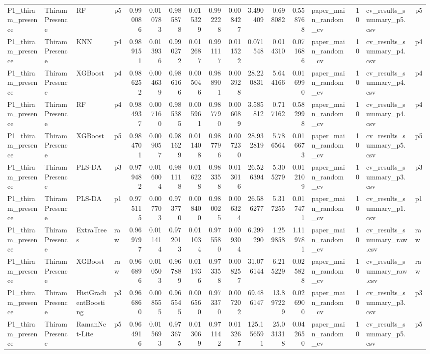 \begin{tabular}{llllrrrrrrrrrlrll}
P1_thiram_presence & Thiram Presence & RF & p5 & 0.990086 & 0.010783 & 0.985878 & 0.015329 & 0.992228 & 0.008427 & 3.490409 & 0.698082 & 0.558768 & paper_main_random_cv & 10 & cv_results_summary_p5.csv & p5 \\
P1_thiram_presence & Thiram Presence & KNN & p4 & 0.989151 & 0.013936 & 0.990272 & 0.012687 & 0.991117 & 0.011522 & 0.071548 & 0.014310 & 0.071686 & paper_main_random_cv & 10 & cv_results_summary_p4.csv & p4 \\
P1_thiram_presence & Thiram Presence & XGBoost & p4 & 0.986252 & 0.004639 & 0.986166 & 0.005046 & 0.988901 & 0.003928 & 28.220831 & 5.644166 & 0.016990 & paper_main_random_cv & 10 & cv_results_summary_p4.csv & p4 \\
P1_thiram_presence & Thiram Presence & RF & p4 & 0.984937 & 0.007160 & 0.985385 & 0.005961 & 0.987790 & 0.006089 & 3.585812 & 0.717162 & 0.582998 & paper_main_random_cv & 10 & cv_results_summary_p4.csv & p4 \\
P1_thiram_presence & Thiram Presence & XGBoost & p5 & 0.984701 & 0.009057 & 0.981629 & 0.011408 & 0.987796 & 0.007230 & 28.932819 & 5.786564 & 0.016673 & paper_main_random_cv & 10 & cv_results_summary_p5.csv & p5 \\
P1_thiram_presence & Thiram Presence & PLS-DA & p3 & 0.979482 & 0.016004 & 0.981118 & 0.016228 & 0.983358 & 0.013016 & 26.526394 & 5.305279 & 0.012109 & paper_main_random_cv & 10 & cv_results_summary_p3.csv & p3 \\
P1_thiram_presence & Thiram Presence & PLS-DA & p1 & 0.975115 & 0.007703 & 0.973770 & 0.008400 & 0.980025 & 0.006324 & 26.586277 & 5.317255 & 0.017471 & paper_main_random_cv & 10 & cv_results_summary_p1.csv & p1 \\
P1_thiram_presence & Thiram Presence & ExtraTrees & raw & 0.969797 & 0.011414 & 0.972013 & 0.011034 & 0.975580 & 0.009304 & 6.299290 & 1.259858 & 1.119781 & paper_main_random_cv & 10 & cv_results_summary_raw.csv & raw \\
P1_thiram_presence & Thiram Presence & XGBoost & raw & 0.966896 & 0.010503 & 0.967889 & 0.011936 & 0.973358 & 0.008257 & 31.076144 & 6.215229 & 0.025828 & paper_main_random_cv & 10 & cv_results_summary_raw.csv & raw \\
P1_thiram_presence & Thiram Presence & HistGradientBoosting & p3 & 0.966860 & 0.008555 & 0.965545 & 0.006560 & 0.973370 & 0.007202 & 69.486147 & 13.897229 & 0.026900 & paper_main_random_cv & 10 & cv_results_summary_p3.csv & p3 \\
P1_thiram_presence & Thiram Presence & RamanNet-Lite & p5 & 0.964916 & 0.015693 & 0.973675 & 0.013069 & 0.971142 & 0.013267 & 125.156591 & 25.031318 & 0.042650 & paper_main_random_cv & 10 & cv_results_summary_p5.csv & p5 \\

\end{tabular}

